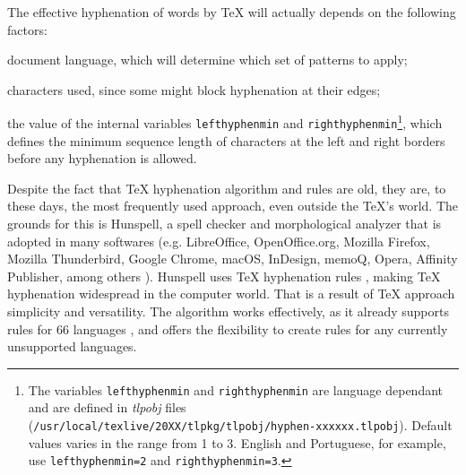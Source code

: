 \documentclass{article}
\begin{document}
The effective hyphenation of words by \TeX{} will actually depends on the following factors:
\begin{enumerate*}[label=(\arabic*)]
    \item document language, which will determine which set of patterns to apply;
    \item characters used, since some might block hyphenation at their edges;
    \item the value of the internal variables \verb|lefthyphenmin| and \verb|righthyphenmin|\footnote{
	The variables \verb|lefthyphenmin| and \verb|righthyphenmin| are language dependant and
	are defined in \emph{tlpobj} files (\verb|/usr/local/texlive/20XX/tlpkg/tlpobj/hyphen-xxxxxx.tlpobj|). 
	Default values varies in the range from 1 to 3. 
    	English and Portuguese, for example, use \verb|lefthyphenmin=2| and \verb|righthyphenmin=3|.},
        which defines the minimum sequence length of characters at the left and right borders
        before any hyphenation is allowed.
\end{enumerate*}

Despite the fact that \TeX{} hyphenation algorithm and rules are old, they are,
to these days, the most frequently used approach, even outside the \TeX{}'s
world. The grounds for this is Hunspell, a spell checker and morphological
analyzer that is adopted in many softwares (e.g. LibreOffice, OpenOffice.org,
Mozilla Firefox, Mozilla Thunderbird, Google Chrome, macOS, InDesign, memoQ,
Opera, Affinity Publisher, among others \parencite{hunspell}). Hunspell uses \TeX{}
hyphenation rules \parencite{hunspellhyphen,levien1998}, making \TeX{} hyphenation
widespread in the computer world. That is a result of \TeX{} approach
simplicity and versatility.  The algorithm works effectively, as it already
supports rules for 66 languages \parencite{texhyphenrules}, and offers the
flexibility to create rules for any currently unsupported languages.
\end{document}
